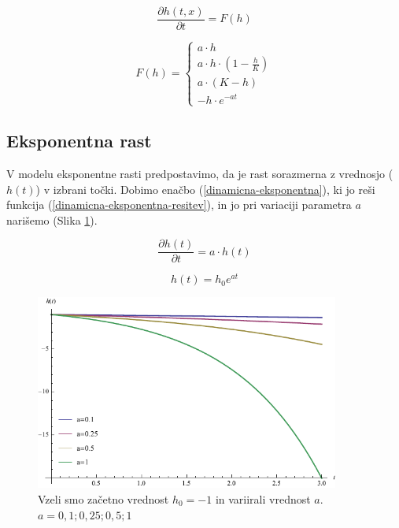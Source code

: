 \documentclass[a4paper, twoside, 12pt]{book}
\begin{document}
            \begin{equation}
              \frac{ \partial h(t,x) }{ \partial t} = F(h)
              \label{dinamicna-splosna}
            \end{equation}

          \begin{equation}
            F(h) = \left \{ \begin{array}{lr} 
            a \cdot h \\
            a \cdot h \cdot (1 - \frac{h}{K}) \\
            a \cdot (K - h) \\
            - h \cdot e^{-a t}
            \end{array} \right. 
            \label{dinamicna-variacije}
          \end{equation}

          \subsection{Eksponentna rast}

          V modelu eksponentne rasti predpostavimo, da je rast sorazmerna z vrednosjo ($h(t)$) v izbrani točki. Dobimo enačbo (\ref{dinamicna-eksponentna}), ki jo reši funkcija (\ref{dinamicna-eksponentna-resitev}), in jo pri variaciji parametra $a$ narišemo (Slika \ref{fig:eksponentna-rast}).

          \begin{equation}
            \frac{\partial h(t)}{\partial t} = a \cdot h(t)
            \label{dinamicna-eksponentna}
          \end{equation}

          \begin{equation}
            h(t) = h_0 e^{a t}
            \label{dinamicna-eksponentna-resitev}
          \end{equation}

          \begin{figure}[h]
            \begin{center}
              \includegraphics[width=10cm]{slike/eksponentna-rast}
            \end{center}
            \caption{Vzeli smo začetno vrednost $h_0 = -1$ in variirali vrednost $a$. \newline $a=0,1;0,25;0,5;1$}
            \label{fig:eksponentna-rast}
          \end{figure}
\end{document}
